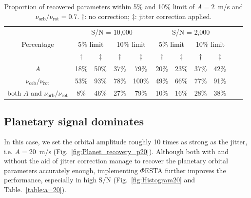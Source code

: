 \begin{table}[h!]
\centering
\begin{tabular}{|c|c|c|c|c|c|c|c|c|ll}
\cline{1-9}
\multirow{3}{*}{Percentage} & \multicolumn{4}{c|}{S/N = 10,000}                        & \multicolumn{4}{c|}{S/N = 2,000}                         &  &  \\ \cline{2-9}
                            & \multicolumn{2}{c|}{5\% limit} & \multicolumn{2}{c|}{10\% limit} & \multicolumn{2}{c|}{5\% limit} & \multicolumn{2}{c|}{10\% limit} &  &  \\ \cline{2-9}
                            				& $\dagger$     & $\ddagger$   & $\dagger$           & $\ddagger$           & $\dagger$           & $\ddagger$          & $\dagger$            & $\ddagger$          &  &  \\ \cline{1-9}
$A$                         					& 18\%            & 50\%           & 37\%            & 79\%            & 20\%            & 23\%           & 37\%             & 42\%           &  &  \\ \cline{1-9}
$\nu_\text{orb}/\nu_\text{rot}$              	& 53\%            & 93\%           & 78\%            & 100\%            & 49\%            & 66\%           & 77\%             & 91\%           &  &  \\ \cline{1-9}
both $A$ and $\nu_\text{orb}/\nu_\text{rot}$    & 8\%             & 46\%           & 27\%            & 79\%            & 10\%            & 16\%           & 28\%             & 38\%           &  &  \\ \cline{1-9}
\end{tabular}
\caption{Proportion of recovered parameters within 5\% and 10\% limit of $A = 2$~m/s and $\nu_\text{orb}/\nu_\text{rot} =0.7$. $\dagger$: no correction; $\ddagger$: jitter correction applied.}
\label{table:a=2}
\end{table}
\FloatBarrier

\subsection{Planetary signal dominates}

In this case, we set the orbital amplitude roughly 10 times as strong as the jitter, i.e. $A = 20$~m/s (Fig.~\ref{fig:Planet_recovery_p20}). Although both with and without the aid of jitter correction manage to recover the planetary orbital parameters accurately enough, implementing $\mathit{\Phi}$ESTA further improves the performance, especially in high S/N (Fig.~\ref{fig:Histogram20} and Table.~\ref{table:a=20}). 


